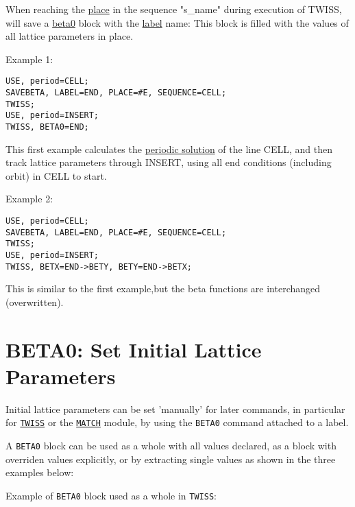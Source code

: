 When reaching the \href{../control/general.html#place}{place} in the
sequence "s\_name" during execution of TWISS, \madx will save a
\hyperref[sec:beta0]{beta0} block with the
\href{../Introduction/label.html}{label} name: This block is filled with
the values of all lattice parameters in place.  

Example 1: 
\begin{verbatim}
USE, period=CELL;
SAVEBETA, LABEL=END, PLACE=#E, SEQUENCE=CELL;
TWISS;
USE, period=INSERT;
TWISS, BETA0=END;
\end{verbatim}
This first example calculates the \hyperref[sec:twissperiod]{periodic
  solution} of the line CELL, and then track lattice parameters through
INSERT, using all end conditions (including orbit) in CELL to start.  

Example 2: 
\begin{verbatim}
USE, period=CELL;
SAVEBETA, LABEL=END, PLACE=#E, SEQUENCE=CELL;
TWISS;
USE, period=INSERT;
TWISS, BETX=END->BETY, BETY=END->BETX;
\end{verbatim}
This is similar to the first example,but the beta functions are interchanged (overwritten).  

\section{BETA0: Set Initial Lattice Parameters}
\label{sec:beta0}
Initial lattice parameters can be set 'manually' for later commands, in
particular for \hyperref[chap:twiss]{\tt TWISS} or the 
\hyperref[chap:match]{\tt MATCH} module, by
using the {\tt BETA0} command attached to a label.  


A {\tt BETA0} block can be used as a whole with all values declared,
as a block with overriden values explicitly, or by extracting single
values as shown in the three examples below:

Example of {\tt BETA0} block used as a whole in {\tt TWISS}: 


